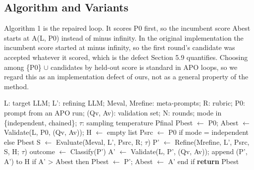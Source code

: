 \documentclass{ieeeaccess}
\begin{document}
\subsection{Algorithm and Variants}

Algorithm 1 is the repaired loop. It scores P0 first, so the incumbent score Abest starts at A(L, P0) instead of minus infinity. In the original implementation the incumbent score started at minus infinity, so the first round's candidate was accepted whatever it scored, which is the defect Section 5.9 quantifies. Choosing among \{P0\} $\cup$ candidates by held-out score is standard in APO loops, so we regard this as an implementation defect of ours, not as a general property of the method.

\begin{algorithm}[htbp]
\caption{MPIR with a validation gate (repaired)}
\begin{algorithmic}[1]
\Require L: target LLM; L': refining LLM; Meval, Mrefine: meta-prompts; R: rubric; P0: prompt from an APO run; (Qv, Av): validation set; N: rounds; mode in \{independent, chained\}; $\tau$: sampling temperature
\Ensure Pfinal
\State Pbest $\leftarrow$ P0; Abest $\leftarrow$ Validate(L, P0, (Qv, Av)); H $\leftarrow$ empty list 
\State Psrc $\leftarrow$ P0 if mode = independent else Pbest
\State S $\leftarrow$ Evaluate(Meval, L', Psrc, R; $\tau$) 
\State P' $\leftarrow$ Refine(Mrefine, L', Psrc, S, H; $\tau$) 
\State outcome $\leftarrow$ Classify(P') 
\State A' $\leftarrow$ Validate(L, P', (Qv, Av)); append (P', A') to H
\State if A' > Abest then Pbest $\leftarrow$ P'; Abest $\leftarrow$ A' end if 
\EndIf
\EndFor
\State \textbf{return} Pbest
\end{algorithmic}
\end{algorithm}
\end{document}
